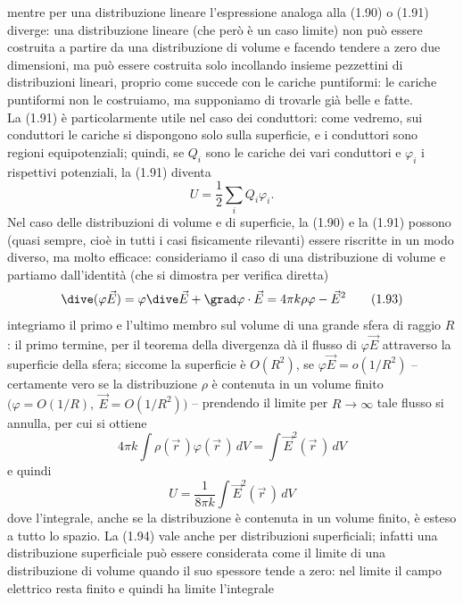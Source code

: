 mentre per una distribuzione lineare l'espressione analoga alla (1.90) o (1.91)
diverge: una distribuzione lineare (che per\`o \`e un caso limite) non pu\`o
essere costruita a partire da una distribuzione di volume e facendo tendere a
zero due dimensioni, ma pu\`o essere costruita solo incollando insieme
pezzettini di distribuzioni lineari, proprio come succede con le cariche
puntiformi: le cariche puntiformi non le costruiamo, ma supponiamo di trovarle
gi\`a belle e fatte.\\
La (1.91) \`e particolarmente utile nel caso dei conduttori: come vedremo, sui
conduttori le cariche si dispongono solo sulla superficie, e i conduttori sono
regioni equipotenziali; quindi, se $Q_i$ sono le cariche dei vari conduttori e
$\varphi_i$ i rispettivi potenziali, la (1.91) diventa
\begin{equation}
  U=\frac12\sum_iQ_i\varphi_i.
  \tag{1.92}
\end{equation}
Nel caso delle distribuzioni di volume e di superficie, la (1.90) e la (1.91)
possono (quasi sempre, cio\`e in tutti i casi fisicamente rilevanti) essere
riscritte in un modo diverso, ma molto efficace: consideriamo il caso di una
distribuzione di volume e partiamo dall'identit\`a (che si dimostra per verifica
diretta)
\begin{equation}
  \dive(\varphi\vec E)=\varphi\dive\vec E+\grad\varphi\cdot\vec E
  =4\pi k\rho\varphi-\vec E^2
  \tag{1.93}
\end{equation}
integriamo il primo e l'ultimo membro sul volume di una grande sfera di raggio
$R$: il primo termine, per il teorema della divergenza d\`a il flusso di
$\varphi\vec E$ attraverso la superficie della sfera; siccome la superficie \`e
$O(R^2)$, se $\varphi\vec E=o(1/R^2)$ -- certamente vero se la distribuzione
$\rho$ \`e contenuta in un volume finito
$\big(\varphi=O(1/R),\ \vec E=O(1/R^2)\big)$ -- prendendo il limite per
$R\to\infty$ tale flusso si annulla, per cui si ottiene
\[
  4\pi k\int\rho(\vec r\,)\varphi(\vec r\,)\,dV=\int\vec E^2(\vec r\,)\,dV
\]
e quindi
\begin{equation}
  U=\frac{1}{8\pi k}\int\vec E^2(\vec r\,)\,dV
  \tag{1.94}
\end{equation}
dove l'integrale, anche se la distribuzione \`e contenuta in un volume finito,
\`e esteso a tutto lo spazio. La (1.94) vale anche per distribuzioni
superficiali; infatti una distribuzione superficiale pu\`o essere considerata
come il limite di una distribuzione di volume quando il suo spessore tende a
zero: nel limite il campo elettrico resta finito e quindi ha limite l'integrale

